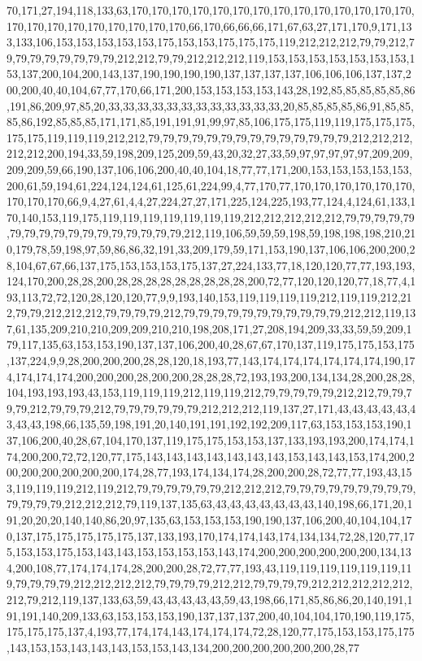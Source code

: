 70,171,27,194,118,133,63,170,170,170,170,170,170,170,170,170,170,170,170,170,170,170,170,170,170,170,170,170,170,170,66,170,66,66,66,171,67,63,27,171,170,9,171,133,133,106,153,153,153,153,153,175,153,153,175,175,175,119,212,212,212,79,79,212,79,79,79,79,79,79,79,79,212,212,79,79,212,212,212,119,153,153,153,153,153,153,153,153,137,200,104,200,143,137,190,190,190,190,137,137,137,137,106,106,106,137,137,200,200,40,40,104,67,77,170,66,171,200,153,153,153,153,143,28,192,85,85,85,85,85,86,191,86,209,97,85,20,33,33,33,33,33,33,33,33,33,33,33,33,20,85,85,85,85,86,91,85,85,85,86,192,85,85,85,171,171,85,191,191,91,99,97,85,106,175,175,119,119,175,175,175,175,175,119,119,119,212,212,79,79,79,79,79,79,79,79,79,79,79,79,79,79,212,212,212,212,212,200,194,33,59,198,209,125,209,59,43,20,32,27,33,59,97,97,97,97,97,209,209,209,209,59,66,190,137,106,106,200,40,40,104,18,77,77,171,200,153,153,153,153,153,200,61,59,194,61,224,124,124,61,125,61,224,99,4,77,170,77,170,170,170,170,170,170,170,170,170,66,9,4,27,61,4,4,27,224,27,27,171,225,124,225,193,77,124,4,124,61,133,170,140,153,119,175,119,119,119,119,119,119,119,212,212,212,212,212,79,79,79,79,79,79,79,79,79,79,79,79,79,79,79,79,79,212,119,106,59,59,59,198,59,198,198,198,210,210,179,78,59,198,97,59,86,86,32,191,33,209,179,59,171,153,190,137,106,106,200,200,28,104,67,67,66,137,175,153,153,153,175,137,27,224,133,77,18,120,120,77,77,193,193,124,170,200,28,28,200,28,28,28,28,28,28,28,28,28,200,72,77,120,120,120,77,18,77,4,193,113,72,72,120,28,120,120,77,9,9,193,140,153,119,119,119,119,212,119,119,212,212,79,79,212,212,212,79,79,79,79,212,79,79,79,79,79,79,79,79,79,79,79,212,212,119,137,61,135,209,210,210,209,209,210,210,198,208,171,27,208,194,209,33,33,59,59,209,179,117,135,63,153,153,190,137,137,106,200,40,28,67,67,170,137,119,175,175,153,175,137,224,9,9,28,200,200,200,28,28,120,18,193,77,143,174,174,174,174,174,174,190,174,174,174,174,200,200,200,28,200,200,28,28,28,72,193,193,200,134,134,28,200,28,28,104,193,193,193,43,153,119,119,119,212,119,119,212,79,79,79,79,79,212,212,79,79,79,79,212,79,79,79,212,79,79,79,79,79,79,212,212,212,119,137,27,171,43,43,43,43,43,43,43,43,198,66,135,59,198,191,20,140,191,191,192,192,209,117,63,153,153,153,190,137,106,200,40,28,67,104,170,137,119,175,175,153,153,137,133,193,193,200,174,174,174,200,200,72,72,120,77,175,143,143,143,143,143,143,143,153,143,143,153,174,200,200,200,200,200,200,200,174,28,77,193,174,134,174,28,200,200,28,72,77,77,193,43,153,119,119,119,212,119,212,79,79,79,79,79,79,212,212,212,79,79,79,79,79,79,79,79,79,79,79,79,79,212,212,212,79,119,137,135,63,43,43,43,43,43,43,43,140,198,66,171,20,191,20,20,20,140,140,86,20,97,135,63,153,153,153,190,190,137,106,200,40,104,104,170,137,175,175,175,175,175,137,133,193,170,174,174,143,174,134,134,72,28,120,77,175,153,153,175,153,143,143,153,153,153,153,143,174,200,200,200,200,200,200,134,134,200,108,77,174,174,174,28,200,200,28,72,77,77,193,43,119,119,119,119,119,119,119,79,79,79,79,212,212,212,212,79,79,79,79,212,212,79,79,79,79,212,212,212,212,212,212,79,212,119,137,133,63,59,43,43,43,43,43,59,43,198,66,171,85,86,86,20,140,191,191,191,140,209,133,63,153,153,153,190,137,137,137,200,40,104,104,170,190,119,175,175,175,175,137,4,193,77,174,174,143,174,174,174,72,28,120,77,175,153,153,175,175,143,153,153,143,143,143,153,153,143,134,200,200,200,200,200,200,28,77